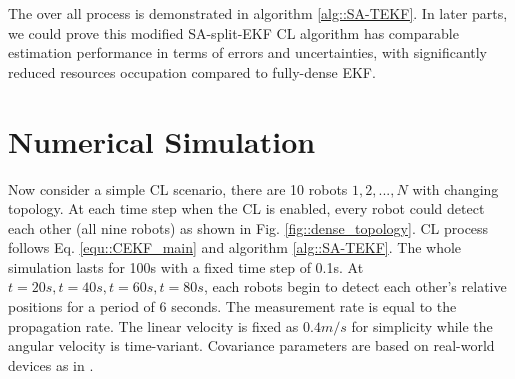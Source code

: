 \documentclass[conference]{IEEEtran}
\begin{document}
The over all process is demonstrated in algorithm \ref{alg::SA-TEKF}.
In later parts, we could prove this modified SA-split-EKF CL algorithm has comparable estimation performance in terms of errors and uncertainties, with significantly reduced resources occupation compared to fully-dense EKF.


\section{Numerical Simulation}
Now consider a simple CL scenario, there are 10 robots $1,2,...,N$ with changing topology.
At each time step when the CL is enabled, every robot could detect each other (all nine robots) as shown in Fig. \ref{fig::dense_topology}.
CL process follows Eq. \eqref{equ::CEKF_main} and algorithm \ref{alg::SA-TEKF}.
The whole simulation lasts for 100s with a fixed time step of 0.1s.
At $t=20s,t=40s,t=60s,t=80s$, each robots begin to detect each other's relative positions for a period of 6 seconds.
The measurement rate is equal to the propagation rate.
The linear velocity is fixed as $0.4m/s$ for simplicity while the angular velocity is time-variant.
Covariance parameters are based on real-world devices as in \cite{leung2012cooperative,leung2011utias}.
\end{document}
